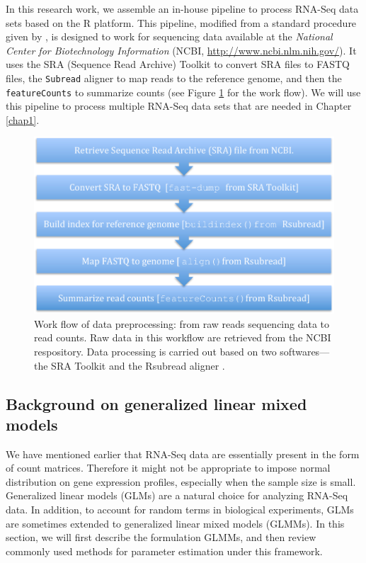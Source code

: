 In this research work, we assemble an in-house pipeline to process RNA-Seq data sets based on the R \citep{Rpackage}
platform.
This pipeline, modified from a standard procedure given by \citet{anders2013count},   is designed to work
for sequencing data available at the \textit{National Center for Biotechnology Information} (NCBI,
\url{http://www.ncbi.nlm.nih.gov/}). It uses the SRA (Sequence Read Archive) Toolkit
\citep{leinonen2010sequence} to convert SRA files to FASTQ files, the \verb|Subread| aligner
\citep{liao2013subread} to map reads to the reference genome, and then the \verb|featureCounts| 
\citep{liao2013featurecounts} to summarize
counts (see Figure \ref{fig:flowchart} for the work flow). We will use this pipeline to process 
multiple
RNA-Seq data sets that are needed in Chapter \ref{chap1}.
\begin{figure}[!ht]
	\centering
	\includegraphics[width=0.7\linewidth]{Figures/flowchart.pdf}
	\caption{Work flow of data preprocessing: from raw reads sequencing data to read counts. Raw 
	data in this workflow are retrieved from the NCBI respository. Data processing is carried out 
	based on two softwares---the SRA Toolkit \citep{leinonen2010sequence} and the Rsubread aligner 
	\citep{liao2013subread}.}
	\label{fig:flowchart}
\end{figure}	



\subsection{Background on generalized linear mixed models}\label{subsec:glmm}
We have mentioned earlier that RNA-Seq data are essentially present in the form of count matrices. 
Therefore it might not be appropriate to impose normal distribution on gene expression profiles, 
especially when the sample size is small. Generalized linear models (GLMs) are a natural choice for 
analyzing RNA-Seq data. In addition, to account for random terms in biological experiments, GLMs 
are 
sometimes extended to generalized linear mixed models (GLMMs).
In this section, we will first describe the formulation GLMMs,
and then review commonly used methods for parameter estimation under this framework.

